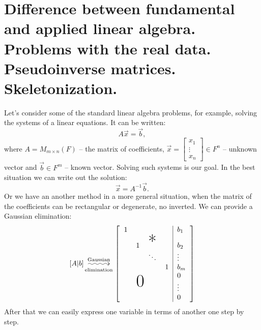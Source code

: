     \section{Difference between fundamental and applied linear algebra. Problems with the real data. Pseudoinverse matrices. Skeletonization.}
    \par 
    Let's consider some of the standard linear algebra problems, for example, solving the systems of a linear equations. It can be written:
    \[
        A\vec{x} = \vec{b},    
    \]
    where $A = M_{m \times n}(F)$ -- the matrix of coefficients, $\vec{x} = \begin{bmatrix}
        x_1 \\
        \vdots \\
        x_n
    \end{bmatrix} \in F^n$ -- unknown vector and $\vec{b} \in F^m$ -- known vector. Solving such systems is our goal. In the best situation we can write out the solution:
    \[
        \vec{x} = A^{-1}\vec{b}.
    \]
    Or we have an another method in a more general situation, when the matrix of the coefficients can be rectangular or degenerate, no inverted. We can provide a Gaussian elimination:
    \[
        [A | b] \overset{\text{Gaussian}}{ \underset{\text{elimination}}{\xymatrix@C=3em{{}\ar@{~>}[r]&{}}}}
        \left[\begin{tabular}{llll|l}
            $1$                    &   & \multicolumn{1}{c}{}  &                   & $b_1$     \\
                                 & $1$ & \multicolumn{1}{c}{\Huge *} &                   & $b_2$     \\
            \multicolumn{1}{r}{} &   & $\ddots$              &                   & $\vdots$ \\
            \multicolumn{1}{c}{} &   &                       & $1$                 & $b_m$    \\
            \multicolumn{3}{c}{\multirow{2}{*}{\Huge $0$}}           & \multirow{3}{*}{} & $0$        \\
            \multicolumn{3}{c}{}                             &                   & $\vdots$ \\
                                 &   &                       &                   & $0$       
            \end{tabular}\right]
    \]
    After that we can easily express one variable in terms of another one step by step.
